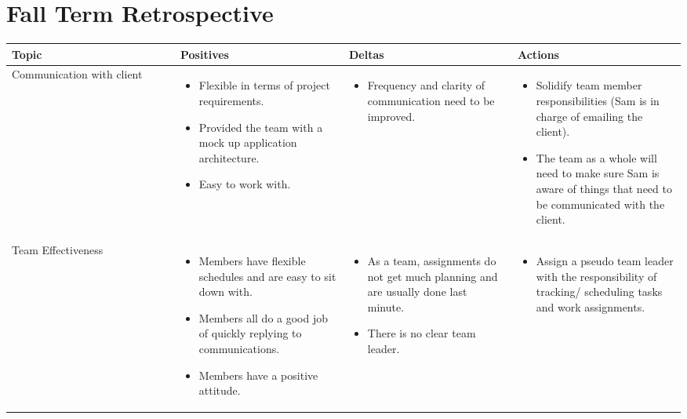 \documentclass[letterpaper,10pt,titlepage,draftclsnofoot,onecolumn,onesided] {IEEEtran}
\begin{document}
\section{Fall Term Retrospective}
	\begin{center}
		\begin{tabular}{ |  p{0.25\linewidth}  |  p{0.25\linewidth}  | p{0.25\linewidth} | p{0.25\linewidth} |}
		\hline
		Topic & Positives & Deltas & Actions \\ \hline
		
			Communication with client 
		& 
			\begin{itemize}
				\item Flexible in terms of project requirements.
				\item Provided the team with a mock up application architecture.
				\item Easy to work with.
			\end{itemize}
		& 
			\begin{itemize}
				\item Frequency and clarity of communication need to be improved.
			\end{itemize}
		&
			\begin{itemize}
				\item Solidify team member responsibilities (Sam is in charge of emailing the client).
				\item The team as a whole will need to make sure Sam is aware of things that need to be communicated with the client.
			\end{itemize} 
		\\ \hline
			Team Effectiveness 
		& 
			\begin{itemize}
				\item Members have flexible schedules and are easy to sit down with.
				\item Members all do a good job of quickly replying to communications.
				\item Members have a positive attitude.
			\end{itemize}
		& 
			\begin{itemize}
				\item As a team, assignments do not get much planning and are usually done last minute.
				\item There is no clear team leader.
			\end{itemize}
		&
			\begin{itemize}
				\item Assign a pseudo team leader with the responsibility of tracking/ scheduling tasks and work assignments.

\end{itemize}
\end{tabular}
\end{center}
\end{document}
